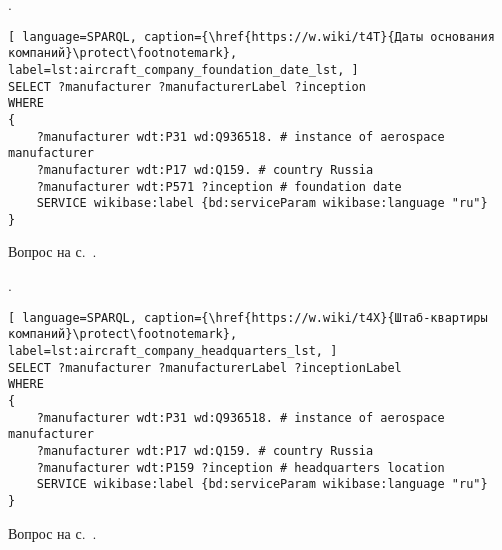 \begin{task}
    \label{answer:aircraft_company_foundation_date}
    . 
    
	\begin{lstlisting}[ language=SPARQL, caption={\href{https://w.wiki/t4T}{Даты основания компаний}\protect\footnotemark}, label=lst:aircraft_company_foundation_date_lst, ]
SELECT ?manufacturer ?manufacturerLabel ?inception
WHERE
{
    ?manufacturer wdt:P31 wd:Q936518. # instance of aerospace manufacturer
  	?manufacturer wdt:P17 wd:Q159. # country Russia
  	?manufacturer wdt:P571 ?inception # foundation date
    SERVICE wikibase:label {bd:serviceParam wikibase:language "ru"}
}
\end{lstlisting}
    
    \small{Вопрос на с.~\pageref{aircraft_question_2}.}
\end{task}

\begin{task}
    \label{answer:aircraft_company_headquarters}
    . 
    
	\begin{lstlisting}[ language=SPARQL, caption={\href{https://w.wiki/t4X}{Штаб-квартиры компаний}\protect\footnotemark}, label=lst:aircraft_company_headquarters_lst, ]
SELECT ?manufacturer ?manufacturerLabel ?inceptionLabel
WHERE
{
    ?manufacturer wdt:P31 wd:Q936518. # instance of aerospace manufacturer
  	?manufacturer wdt:P17 wd:Q159. # country Russia
  	?manufacturer wdt:P159 ?inception # headquarters location
    SERVICE wikibase:label {bd:serviceParam wikibase:language "ru"}
}
\end{lstlisting}
    
    \small{Вопрос на с.~\pageref{aircraft_question_3}.}
\end{task}

